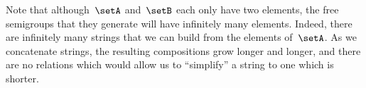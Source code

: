 Note that although~$\setA$ and~$\setB$ each only have two elements, the free semigroups that they generate will have infinitely many elements.
Indeed, there are infinitely many strings that we can build from the elements of~$\setA$.
As we concatenate strings, the resulting compositions grow longer and longer, and there are no relations which would allow us to ``simplify'' a string to one which is shorter.

